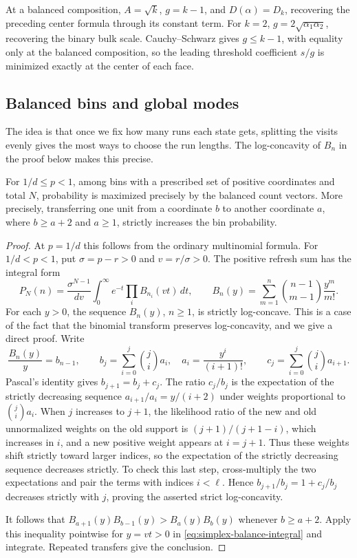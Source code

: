 At a balanced composition, $A=\sqrt k$, $g=k-1$, and
$D(\alpha)=D_k$, recovering the preceding center formula through its
constant term. For $k=2$, $g=2\sqrt{\alpha_1\alpha_2}$, recovering the
binary bulk scale. Cauchy--Schwarz gives $g\le k-1$, with equality only at
the balanced composition, so the leading threshold coefficient $s/g$
is minimized exactly at the center of each face.

\subsection{Balanced bins and global modes}

The idea is that once we fix how many runs each state gets, splitting the
visits evenly gives the most ways to choose the run lengths. The
log-concavity of $B_n$ in the proof below makes this precise.

\begin{theorem}\label{thm:simplex-balance}
For $1/d\le p<1$, among bins with a prescribed set of positive coordinates
and total $N$, probability is maximized precisely by the balanced count
vectors. More precisely, transferring one unit from a coordinate $b$ to
another coordinate $a$, where $b\ge a+2$ and $a\ge1$, strictly increases
the bin probability.
\end{theorem}

\begin{proof}
At $p=1/d$ this follows from the ordinary multinomial formula. For
$1/d<p<1$, put $\sigma=p-r>0$ and $v=r/\sigma>0$.
The positive refresh sum has the integral form
\begin{equation}\label{eq:simplex-balance-integral}
P_N(n)=\frac{\sigma^{N-1}}{dv}\int_0^\infty e^{-t}
\prod_i B_{n_i}(vt)\,dt,\qquad
B_n(y)=\sum_{m=1}^n\binom{n-1}{m-1}\frac{y^m}{m!}.
\end{equation}
For each $y>0$, the sequence $B_n(y)$, $n\ge1$, is strictly log-concave.
This is a case of the fact that the binomial transform preserves
log-concavity, and we give a direct proof. Write
\[
\frac{B_n(y)}y=b_{n-1},\qquad
b_j=\sum_{i=0}^j\binom ji a_i,\quad
a_i=\frac{y^i}{(i+1)!},\qquad
c_j=\sum_{i=0}^j\binom ji a_{i+1}.
\]
Pascal's identity gives $b_{j+1}=b_j+c_j$.
The ratio $c_j/b_j$ is the expectation of the strictly decreasing sequence
$a_{i+1}/a_i=y/(i+2)$ under weights proportional to $\binom ji a_i$.
When $j$ increases to $j+1$, the likelihood ratio of the new and old
unnormalized weights on the old support is
$(j+1)/(j+1-i)$, which increases in $i$, and a new positive weight
appears at $i=j+1$. Thus these weights shift strictly toward larger
indices, so the expectation of the strictly decreasing sequence decreases
strictly. To check this last step, cross-multiply the two expectations and
pair the terms with indices $i<\ell$. Hence
$b_{j+1}/b_j=1+c_j/b_j$ decreases strictly with $j$, proving the asserted
strict log-concavity.

It follows that
$B_{a+1}(y)B_{b-1}(y)>B_a(y)B_b(y)$ whenever $b\ge a+2$.
Apply this inequality pointwise for $y=vt>0$ in
\eqref{eq:simplex-balance-integral} and integrate. Repeated transfers give
the conclusion.
\end{proof}

